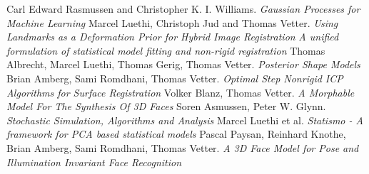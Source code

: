 \begin{thebibliography}{9}

 Carl Edward Rasmussen and Christopher K. I. Williams. \emph{Gaussian Processes for Machine Learning}
 Marcel Luethi, Christoph Jud and Thomas Vetter. \emph{Using Landmarks as a Deformation Prior for Hybrid Image Registration}
 \emph{A unified formulation of statistical model fitting and non-rigid registration}
 Thomas Albrecht, Marcel Luethi, Thomas Gerig, Thomas Vetter. \emph{Posterior Shape Models}
 Brian Amberg, Sami Romdhani, Thomas Vetter. \emph{Optimal Step Nonrigid ICP Algorithms for Surface Registration}
 Volker Blanz, Thomas Vetter. \emph{A Morphable Model For The Synthesis Of 3D Faces}
 Soren Asmussen, Peter W. Glynn. \emph{Stochastic Simulation, Algorithms and Analysis}
 Marcel Luethi et al. \emph{Statismo - A framework for PCA based
statistical models}
 Pascal Paysan, Reinhard Knothe, Brian Amberg, Sami Romdhani, Thomas Vetter. \emph{A 3D Face Model for Pose and Illumination Invariant Face
Recognition}

\end{thebibliography}
